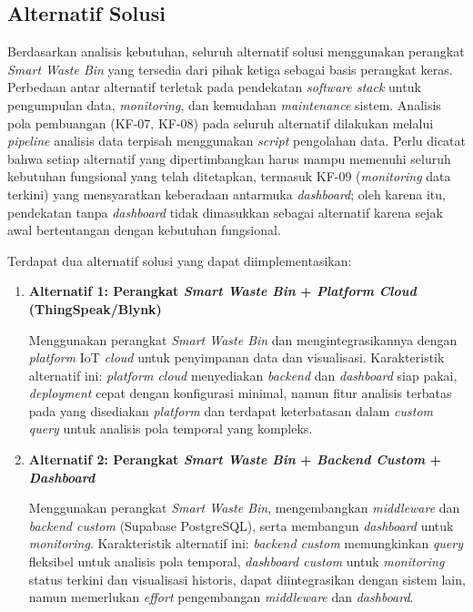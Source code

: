 \subsection{Alternatif Solusi}

Berdasarkan analisis kebutuhan, seluruh alternatif solusi menggunakan perangkat \textit{Smart Waste Bin} yang tersedia dari pihak ketiga sebagai basis perangkat keras. Perbedaan antar alternatif terletak pada pendekatan \textit{software stack} untuk pengumpulan data, \textit{monitoring}, dan kemudahan \textit{maintenance} sistem. Analisis pola pembuangan (KF-07, KF-08) pada seluruh alternatif dilakukan melalui \textit{pipeline} analisis data terpisah menggunakan \textit{script} pengolahan data. Perlu dicatat bahwa setiap alternatif yang dipertimbangkan harus mampu memenuhi seluruh kebutuhan fungsional yang telah ditetapkan, termasuk KF-09 (\textit{monitoring} data terkini) yang mensyaratkan keberadaan antarmuka \textit{dashboard}; oleh karena itu, pendekatan tanpa \textit{dashboard} tidak dimasukkan sebagai alternatif karena sejak awal bertentangan dengan kebutuhan fungsional.

Terdapat dua alternatif solusi yang dapat diimplementasikan:

\begin{enumerate}
    \item \textbf{Alternatif 1: Perangkat \textit{Smart Waste Bin} + \textit{Platform Cloud} (ThingSpeak/Blynk)}

    Menggunakan perangkat \textit{Smart Waste Bin} dan mengintegrasikannya dengan \textit{platform} IoT \textit{cloud} untuk penyimpanan data dan visualisasi. Karakteristik alternatif ini: \textit{platform cloud} menyediakan \textit{backend} dan \textit{dashboard} siap pakai, \textit{deployment} cepat dengan konfigurasi minimal, namun fitur analisis terbatas pada yang disediakan \textit{platform} dan terdapat keterbatasan dalam \textit{custom query} untuk analisis pola temporal yang kompleks.

    \item \textbf{Alternatif 2: Perangkat \textit{Smart Waste Bin} + \textit{Backend Custom} + \textit{Dashboard}}

    Menggunakan perangkat \textit{Smart Waste Bin}, mengembangkan \textit{middleware} dan \textit{backend custom} (Supabase PostgreSQL), serta membangun \textit{dashboard} untuk \textit{monitoring}. Karakteristik alternatif ini: \textit{backend custom} memungkinkan \textit{query} fleksibel untuk analisis pola temporal, \textit{dashboard custom} untuk \textit{monitoring} status terkini dan visualisasi historis, dapat diintegrasikan dengan sistem lain, namun memerlukan \textit{effort} pengembangan \textit{middleware} dan \textit{dashboard}.
\end{enumerate}

